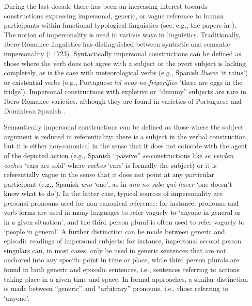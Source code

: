 \documentclass[output=paper]{langscibook}
\begin{document}
During the last decade there has been an increasing interest towards constructions expressing impersonal, generic, or vague reference to human participants within functional-typological linguistics (see, e.g., the papers in \citealt{MalchukovSiewierska2011}). The notion of impersonality is used in various ways in linguistics. Traditionally, Ibero-Romance linguistics has distinguished between syntactic and semantic impersonality (\citealt{FernándezSoriano1999Construcciones}: 1723). Syntactically impersonal constructions can be defined as those where the verb does not agree with a subject or the overt subject is lacking completely, as is the case with meteorological verbs (e.g., Spanish \textit{llueve}  ‘it rains’) or existential verbs (e.g., Portuguese \textit{há ovos no frigorífico}  ‘there are eggs in the fridge’). Impersonal constructions with expletive or “dummy” subjects are rare in Ibero-Romance varieties, although they are found in varieties of Portuguese \citep{Carrilho2005} and Dominican Spanish \citep{Toribio2000}. 



Semantically impersonal constructions can be defined as those where the subject argument is reduced in referentiality: there is a subject in the verbal construction, but it is either non-canonical in the sense that it does not coincide with the agent of the depicted action (e.g., Spanish “passive” \textit{se}-constructions like \textit{se venden coches}  ‘cars are sold’ where \textit{coches}  ‘cars’ is formally the subject) or it is referentially vague in the sense that it does not point at any particular participant (e.g., Spanish \textit{uno}  ‘one’, as in \textit{uno no sabe qué hacer}  ‘one doesn’t know what to do’). In the latter case, typical sources of impersonality are personal pronouns used for non-canonical reference: for instance,  pronouns and verb forms are used in many languages to refer vaguely to ‘anyone in general or in a given situation’, and the third person plural is often used to refer vaguely to ‘people in general’. A further distinction can be made between generic and episodic readings of impersonal subjects: for instance, impersonal second person singulars can, in most cases, only be used in generic sentences that are not anchored into any specific point in time or place, while third person plurals are found in both generic and episodic sentences, i.e., sentences referring to actions taking place in a given time and space. In formal approaches, a similar distinction is made between “generic” and “arbitrary” pronouns, i.e., those referring to ‘anyone’.
\end{document}
